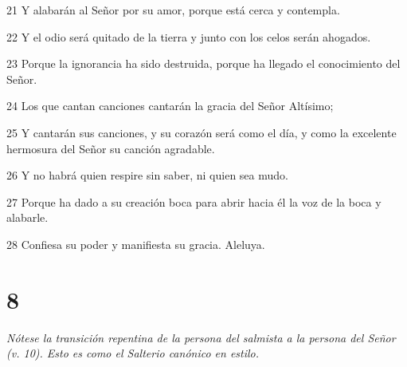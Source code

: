 \par 21 Y alabarán al Señor por su amor, porque está cerca y contempla.
\par 22 Y el odio será quitado de la tierra y junto con los celos serán ahogados.
\par 23 Porque la ignorancia ha sido destruida, porque ha llegado el conocimiento del Señor.
\par 24 Los que cantan canciones cantarán la gracia del Señor Altísimo;
\par 25 Y cantarán sus canciones, y su corazón será como el día, y como la excelente hermosura del Señor su canción agradable.
\par 26 Y no habrá quien respire sin saber, ni quien sea mudo.
\par 27 Porque ha dado a su creación boca para abrir hacia él la voz de la boca y alabarle.
\par 28 Confiesa su poder y manifiesta su gracia. Aleluya.

\chapter{8}

\par \textit{Nótese la transición repentina de la persona del salmista a la persona del Señor (v. 10). Esto es como el Salterio canónico en estilo.}

